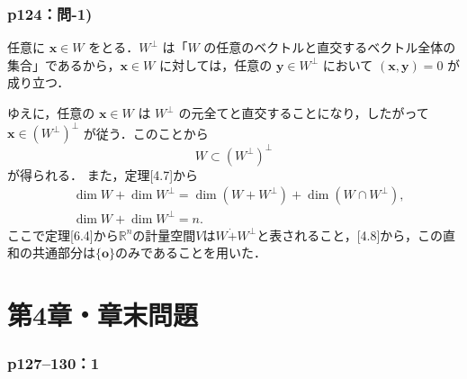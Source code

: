 \section*{p124：問-1)}

\begin{tproof}
  任意に $\bm{x} \in W$ をとる．$W^{\perp}$ は「$W$ の任意のベクトルと直交するベクトル全体の集合」であるから，$\bm{x} \in W$ に対しては，任意の $\bm{y} \in W^{\perp}$ において $(\bm{x}, \bm{y})=0$ が成り立つ．

  ゆえに，任意の $\bm{x} \in W$ は $W^{\perp}$ の元全てと直交することになり，したがって $\bm{x} \in (W^{\perp})^{\perp}$ が従う．このことから
  \[
    W \subset (W^{\perp})^{\perp}
  \]
  が得られる．
  また，定理[4.7]から
  \begin{align*}
     & \dim W +\dim W^{\perp} =\dim (W +W^{\perp} )+\dim (W \cap W^{\perp} ), \\
     & \dim W +\dim W^{\perp} =n.
  \end{align*}
  ここで定理[6.4]から$\mathbb{R}^n$の計量空間$V$は$W\dot{+}W^{\perp}$と表されること，[4.8]から，この直和の共通部分は$\{ \bm{o} \}$のみであることを用いた．
\end{tproof}



\part*{第4章・章末問題}


\section*{p127--130：1}

